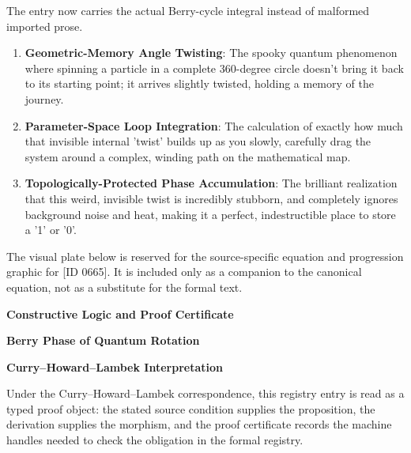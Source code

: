 The entry now carries the actual Berry-cycle integral instead of malformed imported prose.
\endgroup

\begin{enumerate}[leftmargin=1.6em,itemsep=6pt,topsep=4pt]
\item \textbf{Geometric-Memory Angle Twisting}: The spooky quantum phenomenon where spinning a particle in a complete 360-degree circle doesn't bring it back to its starting point; it arrives slightly twisted, holding a memory of the journey.
\item \textbf{Parameter-Space Loop Integration}: The calculation of exactly how much that invisible internal 'twist' builds up as you slowly, carefully drag the system around a complex, winding path on the mathematical map.
\item \textbf{Topologically-Protected Phase Accumulation}: The brilliant realization that this weird, invisible twist is incredibly stubborn, and completely ignores background noise and heat, making it a perfect, indestructible place to store a '1' or '0'.
\end{enumerate}

\begingroup\footnotesize\sloppy
The visual plate below is reserved for the source-specific equation and progression graphic for [ID 0665]. It is included only as a companion to the canonical equation, not as a substitute for the formal text.
\par\endgroup
\ifTZPDarkEdition
{}
\fi

\clearpage
\begingroup\tzpsupportsetup
\noindent\textbf{\fontsize{10.8pt}{12.8pt}\selectfont [ID 0665] Constructive Logic and Proof Certificate}\par
\noindent\textbf{\fontsize{10pt}{12pt}\selectfont Berry Phase of Quantum Rotation}\par
\vspace{0.45em}
\begingroup
\footnotesize
\setlength{\parskip}{0.22em}
\setlength{\parindent}{0pt}
\noindent\textbf{Curry--Howard--Lambek Interpretation}\par
Under the Curry--Howard--Lambek correspondence, this registry entry is read as a typed proof
object: the stated source condition supplies the proposition, the derivation supplies the
morphism, and the proof certificate records the machine handles needed to check the obligation
in the formal registry.

